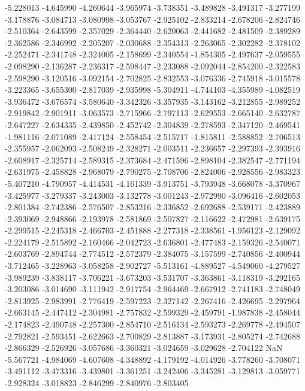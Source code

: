 -5.228013
-4.645990
-4.260644
-3.965974
-3.738351
-3.489828
-3.491317
-3.277199
-3.178876
-3.084713
-3.080998
-3.053767
-2.925102
-2.833214
-2.678206
-2.824746
-2.510364
-2.643599
-2.357029
-2.364440
-2.620063
-2.441682
-2.481509
-2.389289
-2.362586
-2.346992
-2.205207
-2.030688
-2.354313
-2.263065
-2.302282
-2.378102
-2.252471
-2.341748
-2.324005
-2.158699
-2.340554
-1.854305
-2.497637
-2.059555
-2.098290
-2.136287
-2.236317
-2.598447
-2.233088
-2.092044
-2.854200
-2.322583
-2.598290
-3.120516
-3.092154
-2.702825
-2.832553
-3.076336
-2.745918
-3.015578
-3.223365
-3.655300
-2.817039
-2.935998
-5.304911
-4.744103
-4.355989
-4.082519
-3.936472
-3.676574
-3.580640
-3.342326
-3.357935
-3.143162
-3.212855
-2.989252
-2.919842
-2.901911
-3.063573
-2.715966
-2.797113
-2.629553
-2.665140
-2.632787
-2.647227
-2.634335
-2.439850
-2.452742
-2.304839
-2.278593
-2.347120
-2.469541
-1.981116
-2.071089
-2.417124
-2.558454
-2.515717
-1.815811
-2.588852
-2.706513
-2.355957
-2.062093
-2.508249
-2.328271
-2.003511
-2.236657
-2.297393
-2.393916
-2.608917
-2.325714
-2.589315
-2.373684
-2.471596
-2.898104
-2.382547
-2.771194
-2.631975
-2.458828
-2.968079
-2.790275
-2.708706
-2.824006
-2.928556
-2.983323
-5.407210
-4.790957
-4.414531
-4.161339
-3.913751
-3.793948
-3.668078
-3.370967
-3.425977
-3.279337
-3.243003
-3.132778
-3.001243
-2.972990
-3.096416
-2.602053
-2.801384
-2.742386
-2.576507
-2.853216
-2.336852
-2.692688
-2.539171
-2.423889
-2.393069
-2.948866
-2.193978
-2.581869
-2.507827
-2.116622
-2.472981
-2.639175
-2.299515
-2.245318
-2.466703
-2.451888
-2.277318
-2.338561
-1.956123
-2.129092
-2.224179
-2.515892
-2.160466
-2.042723
-2.636801
-2.477483
-2.159326
-2.540071
-2.603769
-2.894744
-2.774512
-2.572379
-2.384075
-3.157599
-2.740856
-2.400944
-3.712465
-3.228963
-3.058258
-2.902727
-5.513161
-4.889527
-4.549060
-4.279527
-3.989239
-3.838117
-3.706221
-3.673203
-3.531707
-3.363861
-3.118319
-3.292165
-3.203086
-3.014690
-3.111942
-2.917754
-2.964469
-2.667912
-2.741183
-2.748049
-2.813925
-2.983991
-2.776419
-2.597223
-2.327142
-2.267416
-2.426695
-2.297964
-2.663145
-2.447412
-2.304981
-2.757832
-2.599329
-2.459791
-1.987838
-2.458044
-2.174823
-2.490748
-2.257300
-2.854710
-2.516134
-2.593273
-2.269778
-2.494507
-2.792821
-2.593451
-2.622663
-2.700829
-2.813887
-3.173931
-2.805274
-2.742688
-2.866329
-2.526926
-3.057686
-3.360321
-3.024659
-3.029628
-2.704122
NaN
-5.567721
-4.984069
-4.607608
-4.348892
-4.179192
-4.014926
-3.778260
-3.708071
-3.491112
-3.473316
-3.439801
-3.361251
-3.242406
-3.345281
-3.129813
-3.059771
-2.928324
-3.018823
-2.846299
-2.840976
-2.803405
